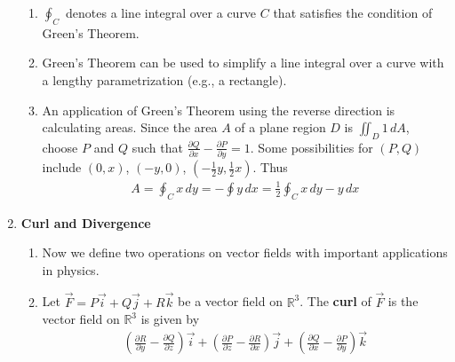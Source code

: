 \documentclass[10pt]{article}
\begin{document}
\begin{multicols*}{2}
\begin{enumerate}
\begin{enumerate}
        \item $\oint_C$ denotes a line integral over a curve $C$ that satisfies the condition of Green’s Theorem.
        \item Green’s Theorem can be used to simplify a line integral over a curve with a lengthy parametrization (e.g., a rectangle). 
        \item An application of Green’s Theorem using the reverse direction is calculating areas. Since the area $A$ of a plane region $D$ is $\iint_D 1 \,dA$, choose $P$ and $Q$ such that $\frac{\partial Q}{\partial x} - \frac{\partial P}{\partial y}=1$. Some possibilities for $(P,Q)$ include $(0,x)$, $(-y,0)$, $(-\frac{1}{2}y, \frac{1}{2}x)$. Thus
        \begin{align*}
            A = \oint_C x \,dy = - \oint y \,dx = \frac{1}{2} \oint_C x \,dy - y \,dx
        \end{align*}
    \end{enumerate}
    
    \item \textbf{Curl and Divergence} 
    \begin{enumerate}
        \item Now we define two operations on vector fields with important applications in physics.
        \item Let $\vec{F} = P\vec{i} + Q\vec{j} + R\vec{k}$ be a vector field on $\mathbb{R}^3$. The \textbf{curl} of $\vec{F}$ is the vector field on $\mathbb{R}^3$ is given by 
        \begin{align*}
            \left( \frac{\partial R}{\partial y} - \frac{\partial Q}{\partial z} \right)\vec{i} + \left( \frac{\partial P}{\partial z} - \frac{\partial R}{\partial x} \right)\vec{j} + \left( \frac{\partial Q}{\partial x} - \frac{\partial P}{\partial y} \right)\vec{k}
        \end{align*}
        

\end{enumerate}
\end{enumerate}
\end{multicols*}
\end{document}

